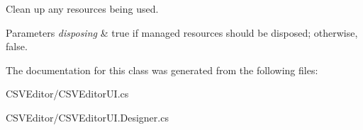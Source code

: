 Clean up any resources being used. 


\begin{DoxyParams}{Parameters}
{\em disposing} & true if managed resources should be disposed; otherwise, false.\\
\hline
\end{DoxyParams}


The documentation for this class was generated from the following files\+:\begin{DoxyCompactItemize}
\item 
C\+S\+V\+Editor/C\+S\+V\+Editor\+U\+I.\+cs\item 
C\+S\+V\+Editor/C\+S\+V\+Editor\+U\+I.\+Designer.\+cs\end{DoxyCompactItemize}
